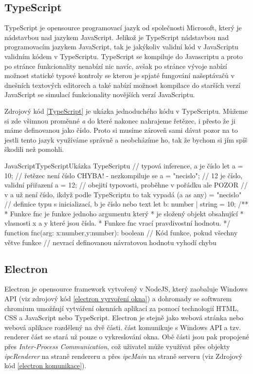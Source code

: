 \documentclass[
  biblatex,
  glossaries,
  printversion
]{kidiplom}
\begin{document}
\subsection{TypeScript}
TypeScript je opensource programovací jazyk od společnosti Microsoft, který je nádstavbou nad jazykem JavaScript.
Jelikož je TypeScript nádstavbou nad programovacím jazykem JavaScript, tak je jakýkoliv validní kód v JavaScriptu validním kódem v TypeScriptu.
TypeScript se kompiluje do Javascriptu a proto po stránce 
funkcionality nenabízí nic navíc, avšak po stránce vývoje 
nabízí možnost statické typové kontroly
se kterou je spjaté fungování našeptávačů v dnešních textových 
editorech a také nabízí možnost kompilace do 
starších verzí JavaScript se simulací funkcionality 
novějších verzí JavaScriptu.

Zdrojový kód \ref{TypeScript} je ukázka jednoduchého kódu v TypeScriptu. Můžeme
si zde všimnou proměnné \textit{a} do které nakonec nahrajeme 
řetězec, i přesto že 
ji máme definovanou jako číslo. Proto si musíme zároveň sami dávat pozor na to jestli
tento jazyk využíváme správně a neobcházíme ho, tak že bychom si jím spíš škodili než pomohli.
\begin{kicode}{JavaScript}{TypeScript}{Ukázka TypeScriptu}
  // typová inference, a je číslo
  let a = 10;
  // řetězec není číslo CHYBA! - nezkompiluje se
  a = "necislo";
  // 12 je číslo, validní přiřazení
  a = 12; 
  // obejití typovosti, proběhne v pořádku ale POZOR 
  // v a už není číslo, ikdyž podle TypeScriptu to tak vypadá
  (a as any) = "necislo"
  // definice typu s inicializací, b je číslo nebo text
  let b: number | string = 10;
  /**
   * Funkce fnc je funkce jednoho argumentu který 
   * je složený objekt obsahující
   * vlasnosti x a y které jsou čísla.
   * Funkce fnc vrací pravdivostní hodnotu.
   */
  function fnc(arg: {x:number,y:number}): boolean {
      // Kód funkce, pokud všechny větve funkce 
      // nevrací definovanou návratovou hodnotu vyhodí chybu
  }

\end{kicode}


\subsection{Electron}
Electron je opensource framework vytvořený v NodeJS, který 
zaobaluje Windows API (viz zdrojový kód \ref{electron vyrvoření okna}) a dohromady se softwarem chromium umožňují 
vytváření okenních aplikací za pomocí technologií HTML, CSS a JavaScript nebo TypeScript.
Electron je stejně jako webová stránka nebo webová aplikace rozdělený
na dvě části.  část komunikuje s Windows API a 
 tzv. renderer část se stará už pouze o vykreslování 
okna. Obě části jsou pak propojené přes \textit{Inter-Process Communication}, 
což uživatel může využívat přes objekty \textit{ipcRenderer} na straně rendereru
a přes \textit{ipcMain} na straně serveru (viz Zdrojový kód \ref{electron komunikace}).
\end{document}
